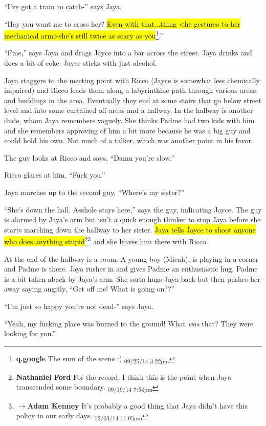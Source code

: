 ``I've got a train to catch-'' says Jaya.

``Hey you want me to cross her?  \hl{Even with that...thing \textless he gestures to her mechanical arm\textgreater  she's still twice as scary as you}\footnote{\textbf{q.google }The sum of the scene :) \textsubscript{09/25/14 3:22pm}}.''

``Fine,'' says Jaya and drags Jayce into a bar across the street.  Jaya drinks and does a bit of coke.  Jayce sticks with just alcohol.



Jaya staggers to the meeting point with Ricco (Jayce is somewhat less chemically impaired) and Ricco leads them along a labyrinthine path through various areas and buildings in the area.  Eventually they end at some stairs that go below street level and into some curtained off areas and a hallway.  In the hallway is another dude, whom Jaya remembers vaguely.  She thinks Padme had two kids with him and she remembers approving of him a bit more because he was a big guy and could hold his own. Not much of a talker, which was another point in his favor.

The guy looks at Ricco and says, ``Damn you're slow.''

Ricco glares at him, ``Fuck you.''

Jaya marches up to the second guy, ``Where's my sister?''

``She's down the hall.  Asshole stays here,'' says the guy, indicating Jayce.  The guy is alarmed by Jaya's arm but isn't a quick enough thinker to stop Jaya before she starts marching down the hallway to her sister.  \hl{Jaya tells Jayce to shoot anyone who does anything stupid}\footnote{\textbf{Nathaniel Ford }For the record, I think this is the point when Jaya transcended some boundary. \textsubscript{09/19/14 7:54pm}}\footnote{$\rightarrow$\textbf{Adam Kenney }It's probably a good thing that Jaya didn't have this policy in our early days. \textsubscript{12/03/14 11:05pm}} and she leaves him there with Ricco.



At the end of the hallway is a room.  A young boy (Micah), is playing in a corner and Padme is there.  Jaya rushes in and gives Padme an enthusiastic hug.  Padme is a bit taken aback by Jaya's arm.  She sorta hugs Jaya back but then pushes her away saying angrily, ``Get off me!  What is going on??''

``I'm just so happy you're not dead-'' says Jaya.

``Yeah, my fucking place was burned to the ground!  What \textit{was }that?  They were looking for you.''

